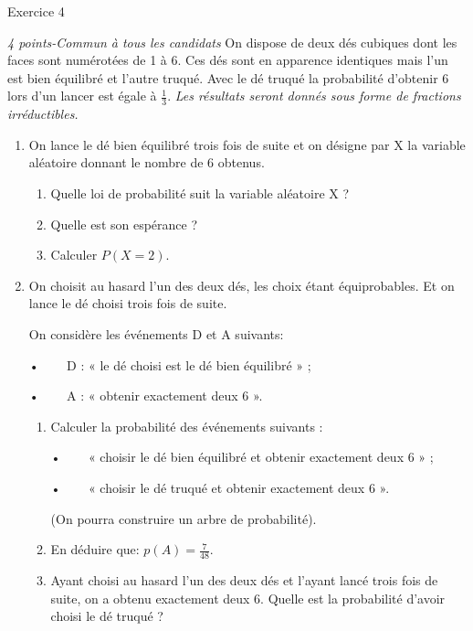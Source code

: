 
%
\begin{h2}Exercice 4\end{h2}
\textit{4 points-Commun à tous les candidats}
On dispose de deux dés cubiques dont les faces sont numérotées de 1 à 6. Ces dés sont en apparence identiques mais l'un est bien équilibré et l'autre truqué. Avec le dé truqué la probabilité d'obtenir 6 lors d'un lancer est égale à $\frac{1}{3}$.
\textit{Les résultats seront donnés sous forme de fractions irréductibles.}
\begin{enumerate}
     \item
     On lance le dé bien équilibré trois fois de suite et on désigne par X la variable aléatoire donnant le nombre de 6 obtenus.
     \begin{enumerate}
          \item
          Quelle loi de probabilité suit la variable aléatoire X ?
          \item
          Quelle est son espérance ?
          \item
          Calculer $P\left(X=2\right)$.
     \end{enumerate}
     \item
     On choisit au hasard l'un des deux dés, les choix étant équiprobables. Et on lance le dé choisi trois fois de suite.
     \par
     On considère les événements D et A suivants:
     \par
     •ﾠﾠ D : « le dé choisi est le dé bien équilibré » ;
     \par
     •ﾠﾠ A : « obtenir exactement deux 6 ».
     \begin{enumerate}
          \item
          Calculer la probabilité des événements suivants :
          \par
          •ﾠﾠ « choisir le dé bien équilibré et obtenir exactement deux 6 » ;
          \par
          •ﾠﾠ « choisir le dé truqué et obtenir exactement deux 6 ».
          \par
          (On pourra construire un arbre de probabilité).
          \item
          En déduire que: $p\left(A\right)=\frac{7}{48}$.
          \item
          Ayant choisi au hasard l'un des deux dés et l'ayant lancé trois fois de suite, on a obtenu exactement deux 6. Quelle est la probabilité d'avoir choisi le dé truqué ?

\end{enumerate}
\end{enumerate}

